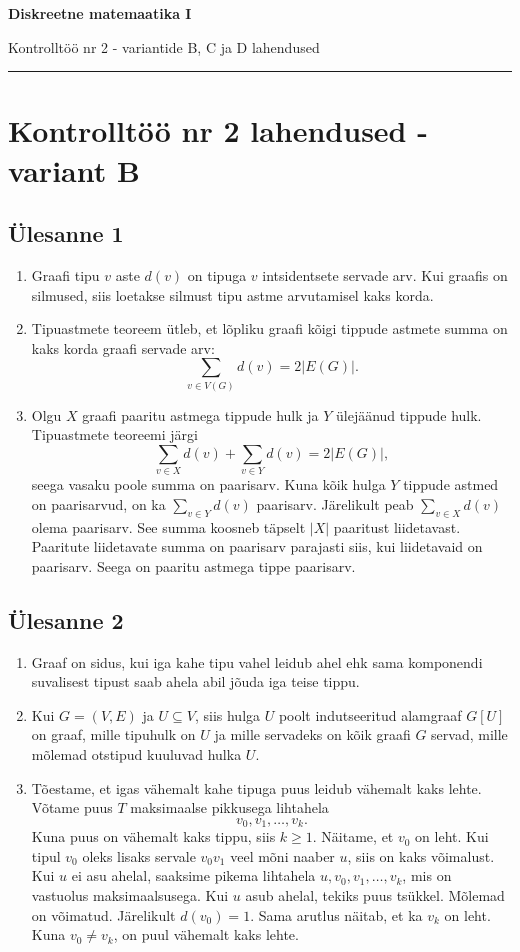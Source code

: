\documentclass[11pt,a4paper]{article}
\newcommand{\yl}[1]{\subsection*{Ülesanne #1}}
\begin{document}
\begin{center}
{\Large\bfseries Diskreetne matemaatika I}\par
{\large Kontrolltöö nr 2 - variantide B, C ja D lahendused}\par
\end{center}
\vspace{2mm}\hrule\vspace{4mm}

\section*{Kontrolltöö nr 2 lahendused - variant B}

\yl{1}
\begin{enumerate}[label=\alph*.]
\item Graafi tipu $v$ aste $d(v)$ on tipuga $v$ intsidentsete servade arv. Kui graafis on silmused, siis loetakse silmust tipu astme arvutamisel kaks korda.
\item Tipuastmete teoreem ütleb, et lõpliku graafi kõigi tippude astmete summa on kaks korda graafi servade arv:
\[
\sum_{v\in V(G)} d(v)=2|E(G)|.
\]
\item Olgu $X$ graafi paaritu astmega tippude hulk ja $Y$ ülejäänud tippude hulk. Tipuastmete teoreemi järgi
\[
\sum_{v\in X}d(v)+\sum_{v\in Y}d(v)=2|E(G)|,
\]
seega vasaku poole summa on paarisarv. Kuna kõik hulga $Y$ tippude astmed on paarisarvud, on ka $\sum_{v\in Y}d(v)$ paarisarv. Järelikult peab $\sum_{v\in X}d(v)$ olema paarisarv. See summa koosneb täpselt $|X|$ paaritust liidetavast. Paaritute liidetavate summa on paarisarv parajasti siis, kui liidetavaid on paarisarv. Seega on paaritu astmega tippe paarisarv.
\end{enumerate}

\yl{2}
\begin{enumerate}[label=\alph*.]
\item Graaf on sidus, kui iga kahe tipu vahel leidub ahel ehk sama komponendi suvalisest tipust saab ahela abil jõuda iga teise tippu.
\item Kui $G=(V,E)$ ja $U\subseteq V$, siis hulga $U$ poolt indutseeritud alamgraaf $G[U]$ on graaf, mille tipuhulk on $U$ ja mille servadeks on kõik graafi $G$ servad, mille mõlemad otstipud kuuluvad hulka $U$.
\item Tõestame, et igas vähemalt kahe tipuga puus leidub vähemalt kaks lehte. Võtame puus $T$ maksimaalse pikkusega lihtahela
\[
v_0,v_1,\ldots,v_k.
\]
Kuna puus on vähemalt kaks tippu, siis $k\ge 1$. Näitame, et $v_0$ on leht. Kui tipul $v_0$ oleks lisaks servale $v_0v_1$ veel mõni naaber $u$, siis on kaks võimalust. Kui $u$ ei asu ahelal, saaksime pikema lihtahela $u,v_0,v_1,\ldots,v_k$, mis on vastuolus maksimaalsusega. Kui $u$ asub ahelal, tekiks puus tsükkel. Mõlemad on võimatud. Järelikult $d(v_0)=1$. Sama arutlus näitab, et ka $v_k$ on leht. Kuna $v_0\ne v_k$, on puul vähemalt kaks lehte.
\end{enumerate}
\end{document}
